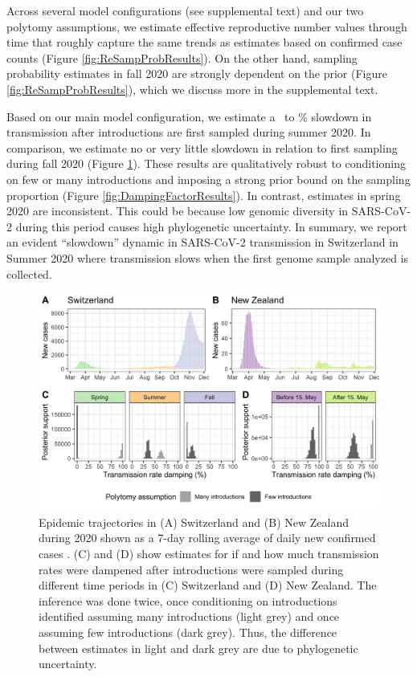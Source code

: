 \documentclass[11pt,twoside,lineno]{pnas-new} %
\begin{document}
Across several model configurations (see supplemental text) and our two polytomy assumptions, we estimate effective reproductive number values through time that roughly capture the same trends as estimates based on confirmed case counts (Figure \ref{fig:ReSampProbResults}). On the other hand, sampling probability estimates in fall 2020 are strongly dependent on the prior (Figure \ref{fig:ReSampProbResults}), which we discuss more in the supplemental text.

Based on our main model configuration, we estimate a \summermaxdampingpercentmedianCHEnosampUB\ to \summermindampingpercentmedianCHEnosampUB\% slowdown in transmission after introductions are first sampled during summer 2020. In comparison, we estimate no or very little slowdown in relation to first sampling during fall 2020 (Figure \ref{fig:scale-factor}). These results are qualitatively robust to conditioning on few or many introductions and imposing a strong prior bound on the sampling proportion (Figure \ref{fig:DampingFactorResults}). In contrast, estimates in spring 2020 are inconsistent. This could be because low genomic diversity in SARS-CoV-2 during this period causes high phylogenetic uncertainty. In summary, we report an evident ``slowdown'' dynamic in SARS-CoV-2 transmission in Switzerland in Summer 2020 where transmission slows when the first genome sample analyzed is collected.

\begin{figure}[h!]
\centering
\includegraphics[width=0.75\linewidth]{figures/contact_tracing_factors_no_sampUB_compared_to_cases.png}
\caption{Epidemic trajectories in (A) Switzerland and (B) New Zealand during 2020 shown as a 7-day rolling average of daily new confirmed cases \cite{Appel}. (C) and (D) show estimates for if and how much transmission rates were dampened after introductions were sampled during different time periods in (C) Switzerland and (D) New Zealand. The inference was done twice, once conditioning on introductions identified assuming many introductions (light grey) and once assuming few introductions (dark grey). Thus, the difference between estimates in light and dark grey are due to phylogenetic uncertainty.}  
\label{fig:scale-factor}
\end{figure}
\end{document}
